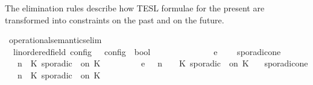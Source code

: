 \begin{isabellebody}
\begin{isamarkuptext}%
The elimination rules describe how TESL formulae for the present are transformed 
  into constraints on the past and on the future.%
\end{isamarkuptext}\isamarkuptrue%
\isamarkupfalse%
\ operational{\isacharunderscore}semantics{\isacharunderscore}elim\isanewline
\ \ {\isacharcolon}{\isacharcolon}{\isacartoucheopen}{\isacharparenleft}{\isacharprime}{\isasymtau}{\isacharcolon}{\isacharcolon}linordered{\isacharunderscore}field{\isacharparenright}\ config\ {\isasymRightarrow}\ {\isacharprime}{\isasymtau}\ config\ {\isasymRightarrow}\ bool{\isacartoucheclose}\ \ \ \ \ \ \ \ \ \ \ \ \ \ {\isacharparenleft}{\isacartoucheopen}{\isacharunderscore}\ {\isasymhookrightarrow}\isactrlsub e\ {\isacharunderscore}{\isacartoucheclose}\ {}{}{\isacharparenright}\isanewline
{}\isanewline
\ \ sporadic{\isacharunderscore}on{\isacharunderscore}e{}{\isacharcolon}\isanewline
%
\isanewline
\ \ {\isacartoucheopen}{\isacharparenleft}{\isasymGamma}{\isacharcomma}\ n\ {\isasymturnstile}\ {\isacharparenleft}{\isacharparenleft}K\ sporadic\ {\isasymtau}\ on\ K\ {\isacharhash}\ {\isasymPsi}{\isacharparenright}\ {\isasymtriangleright}\ {\isasymPhi}{\isacharparenright}\isanewline
\ \ \ \ \ {\isasymhookrightarrow}\isactrlsub e\ \ {\isacharparenleft}{\isasymGamma}{\isacharcomma}\ n\ {\isasymturnstile}\ {\isasymPsi}\ {\isasymtriangleright}\ {\isacharparenleft}{\isacharparenleft}K\ sporadic\ {\isasymtau}\ on\ K\ {\isacharhash}\ {\isasymPhi}{\isacharparenright}{\isacharparenright}{\isacartoucheclose}\isanewline
{\isacharbar}\ sporadic{\isacharunderscore}on{\isacharunderscore}e{}{\isacharcolon}\isanewline
%
\isanewline
\ \ {\isacartoucheopen}{\isacharparenleft}{\isasymGamma}{\isacharcomma}\ n\ {\isasymturnstile}\ {\isacharparenleft}{\isacharparenleft}K\ sporadic\ {\isasymtau}\ on\ K\ {\isacharhash}\ {\isasymPsi}{\isacharparenright}\ {\isasymtriangleright}\ {\isasymPhi}{\isacharparenright}\isanewline

\end{isabellebody}
